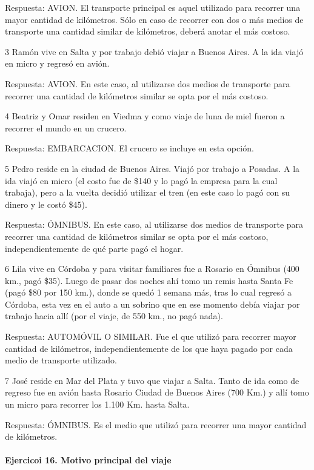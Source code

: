 \documentclass[
  openany]{book}
\begin{document}
Respuesta: AVION. El transporte principal es aquel utilizado para recorrer una mayor cantidad de kilómetros. Sólo en caso de recorrer con dos o más medios de transporte una cantidad similar de kilómetros, deberá anotar el más costoso.

3 Ramón vive en Salta y por trabajo debió viajar a Buenos Aires. A la ida viajó en micro y regresó en avión.

Respuesta: AVION. En este caso, al utilizarse dos medios de transporte para recorrer una cantidad de kilómetros similar se opta por el más costoso.

4 Beatriz y Omar residen en Viedma y como viaje de luna de miel fueron a recorrer el mundo en un crucero.

Respuesta: EMBARCACION. El crucero se incluye en esta opción.

5 Pedro reside en la ciudad de Buenos Aires. Viajó por trabajo a Posadas. A la ida viajó en micro (el costo fue de \$140 y lo pagó la empresa para la cual trabaja), pero a la vuelta decidió utilizar el tren (en este caso lo pagó con su dinero y le costó \$45).

Respuesta: ÓMNIBUS. En este caso, al utilizarse dos medios de transporte para recorrer una cantidad de kilómetros similar se opta por el más costoso, independientemente de qué parte pagó el hogar.

6 Lila vive en Córdoba y para visitar familiares fue a Rosario en Ómnibus (400 km., pagó \$35). Luego de pasar dos noches ahí tomo un remis hasta Santa Fe (pagó \$80 por 150 km.), donde se quedó 1 semana más, tras lo cual regresó a Córdoba, esta vez en el auto a un sobrino que en ese momento debía viajar por trabajo hacia allí (por el viaje, de 550 km., no pagó nada).

Respuesta: AUTOMÓVIL O SIMILAR. Fue el que utilizó para recorrer mayor cantidad de kilómetros, independientemente de los que haya pagado por cada medio de transporte utilizado.

7 José reside en Mar del Plata y tuvo que viajar a Salta. Tanto de ida como de regreso fue en avión hasta Rosario Ciudad de Buenos Aires (700 Km.) y allí tomo un micro para recorrer los 1.100 Km. hasta Salta.

Respuesta: ÓMNIBUS. Es el medio que utilizó para recorrer una mayor cantidad de kilómetros.

\hypertarget{ejercicoi-16.-motivo-principal-del-viaje}{%
\paragraph{Ejercicoi 16. Motivo principal del viaje}\label{ejercicoi-16.-motivo-principal-del-viaje}}
\end{document}
